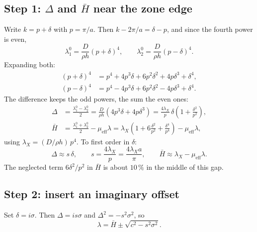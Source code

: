 \subsection{Step 1: $\Delta$ and $\bar{H}$ near the zone edge}
Write $k = p + \delta$ with $p = \pi/a$. Then $k - 2\pi/a = \delta - p$, and since
the fourth power is even,
\begin{equation}
  \lambda_1^0 = \frac{D}{\rho h}(p + \delta)^4, \qquad
  \lambda_2^0 = \frac{D}{\rho h}(p - \delta)^4 .
\end{equation}
Expanding both:
\begin{align}
  (p + \delta)^4 &= p^4 + 4p^3\delta + 6p^2\delta^2 + 4p\delta^3 + \delta^4, \\
  (p - \delta)^4 &= p^4 - 4p^3\delta + 6p^2\delta^2 - 4p\delta^3 + \delta^4 .
\end{align}
The difference keeps the odd powers, the sum the even ones:
\begin{align}
  \Delta &= \frac{\lambda_1^0 - \lambda_2^0}{2}
          = \frac{D}{\rho h}\left(4p^3\delta + 4p\delta^3\right)
          = \frac{4\lambda_X}{p}\,\delta\left(1 + \frac{\delta^2}{p^2}\right), \\
  \bar{H} &= \frac{\lambda_1^0 + \lambda_2^0}{2} - \mu_\mathrm{eff}\lambda
          = \lambda_X\left(1 + 6\frac{\delta^2}{p^2} + \frac{\delta^4}{p^4}\right) - \mu_\mathrm{eff}\lambda ,
\end{align}
using $\lambda_X = (D/\rho h)\,p^4$. To first order in $\delta$:
\begin{equation}
  \Delta \approx s\,\delta, \qquad s = \frac{4\lambda_X}{p} = \frac{4\lambda_X a}{\pi},
  \qquad \bar{H} \approx \lambda_X - \mu_\mathrm{eff}\lambda .
\end{equation}
The neglected term $6\delta^2/p^2$ in $\bar{H}$ is about $10\,\%$ in the middle of
this gap.

\subsection{Step 2: insert an imaginary offset}
Set $\delta = i\sigma$. Then $\Delta = is\sigma$ and $\Delta^2 = -s^2\sigma^2$, so
\begin{equation}
  \lambda = \bar{H} \pm \sqrt{c^2 - s^2\sigma^2} .
\end{equation}

